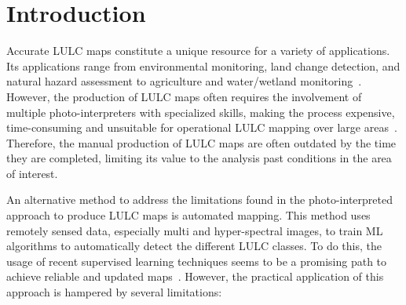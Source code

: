 \chapter{Introduction}
\graphicspath{{figures/introduction/}}

Accurate LULC maps constitute a unique resource for a variety of applications.
Its applications range from environmental monitoring, land change detection,
and natural hazard assessment to agriculture and water/wetland
monitoring~\cite{Khatami2016}. However, the production of LULC maps often
requires the involvement of multiple photo-interpreters with specialized
skills, making the process expensive, time-consuming and unsuitable for
operational LULC mapping over large areas~\cite{Douzas2019rs}. Therefore, the
manual production of LULC maps are often outdated by the time they are
completed, limiting its value to the analysis past conditions in the area of
interest.

An alternative method to address the limitations found in the
photo-interpreted approach to produce LULC maps is automated mapping. This
method uses remotely sensed data, especially multi and hyper-spectral images,
to train ML algorithms to automatically detect the different LULC classes.  To
do this, the usage of recent supervised learning techniques seems to be a
promising path to achieve reliable and updated
maps~\cite{tewkesbury2015critical}. However, the practical application of this
approach is hampered by several limitations: 

